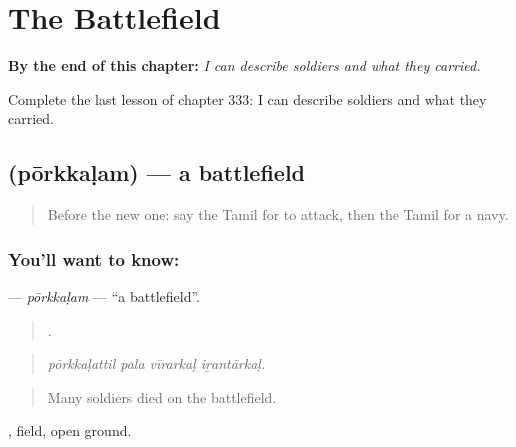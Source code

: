 
\chapter{The Battlefield}
\label{ch:ta-the-battlefield}

\begin{chapteropening}
\textbf{By the end of this chapter:} \emph{I can describe soldiers and what they carried.}

Complete the last lesson of chapter 333: I can describe soldiers and what they carried.
\end{chapteropening}

\section[\texorpdfstring{\ta{போர்க்களம்} (pōrkkaḷam)}{போர்க்களம் (pōrkkaḷam)}]{ (pōrkkaḷam) — a battlefield}

\label{lesson:TA-C333-porkkalam}



\begin{quote}
Before the new one: say the Tamil for to attack, then the Tamil for a navy.
\end{quote}

\subsection*{You'll want to know: }
\textbf{} — \emph{pōrkkaḷam} — \textquotedblleft{}a battlefield\textquotedblright{}.

\begin{quote}
   .
\end{quote}

\begin{quote}
\emph{pōrkkaḷattil pala vīrarkaḷ iṟantārkaḷ.}
\end{quote}

\begin{quote}
Many soldiers died on the battlefield.
\end{quote}

, field, open ground.

